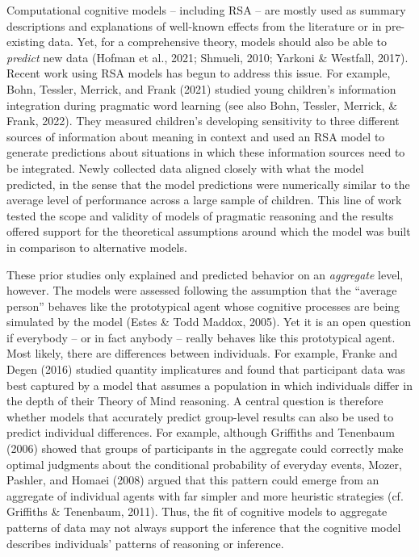 \documentclass[
  man,floatsintext]{apa6}
\begin{document}
Computational cognitive models -- including RSA -- are mostly used as summary descriptions and explanations of well-known effects from the literature or in pre-existing data. Yet, for a comprehensive theory, models should also be able to \emph{predict} new data (Hofman et al., 2021; Shmueli, 2010; Yarkoni \& Westfall, 2017). Recent work using RSA models has begun to address this issue. For example, Bohn, Tessler, Merrick, and Frank (2021) studied young children's information integration during pragmatic word learning (see also Bohn, Tessler, Merrick, \& Frank, 2022). They measured children's developing sensitivity to three different sources of information about meaning in context and used an RSA model to generate predictions about situations in which these information sources need to be integrated. Newly collected data aligned closely with what the model predicted, in the sense that the model predictions were numerically similar to the average level of performance across a large sample of children. This line of work tested the scope and validity of models of pragmatic reasoning and the results offered support for the theoretical assumptions around which the model was built in comparison to alternative models.

These prior studies only explained and predicted behavior on an \emph{aggregate} level, however. The models were assessed following the assumption that the ``average person'' behaves like the prototypical agent whose cognitive processes are being simulated by the model (Estes \& Todd Maddox, 2005). Yet it is an open question if everybody -- or in fact anybody -- really behaves like this prototypical agent. Most likely, there are differences between individuals. For example, Franke and Degen (2016) studied quantity implicatures and found that participant data was best captured by a model that assumes a population in which individuals differ in the depth of their Theory of Mind reasoning. A central question is therefore whether models that accurately predict group-level results can also be used to predict individual differences. For example, although Griffiths and Tenenbaum (2006) showed that groups of participants in the aggregate could correctly make optimal judgments about the conditional probability of everyday events, Mozer, Pashler, and Homaei (2008) argued that this pattern could emerge from an aggregate of individual agents with far simpler and more heuristic strategies (cf. Griffiths \& Tenenbaum, 2011). Thus, the fit of cognitive models to aggregate patterns of data may not always support the inference that the cognitive model describes individuals' patterns of reasoning or inference.
\end{document}

